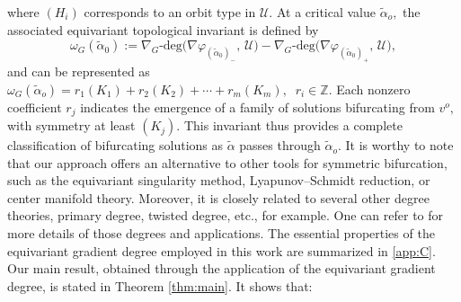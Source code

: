 \documentclass{amsart}%
\begin{document}
where $(H_i)$ corresponds to an orbit type in $\mathcal U.$ At a critical value $\tilde{\alpha}_o,$ the associated equivariant topological invariant  is defined by
\[
\omega_G(\tilde\alpha_0)
:= \nabla_G\text{-deg}\!\big(\nabla \varphi_{(\tilde\alpha_0)_-},\, \mathcal U\big)
 - \nabla_G\text{-deg}\!\big(\nabla \varphi_{(\tilde\alpha_0)_+},\, \mathcal U\big),
\]
and can be represented as
$\omega_G(\tilde{\alpha}_o)=r_1(K_1)+r_2(K_2)+\cdots +r_m(K_m),\;\; r_i\in \mathbb Z.$ 
Each nonzero coefficient $r_j$ indicates the emergence of a family of solutions bifurcating from $v^o,$ with symmetry at least $(K_j).$ This invariant thus provides a complete classification of bifurcating solutions as $\tilde{\alpha}$ passes through $\tilde{\alpha}_o.$ It is worthy to note that our approach offers an alternative to other tools for symmetric bifurcation, such as the equivariant singularity method, Lyapunov–Schmidt reduction, or center manifold theory.
Moreover, it is closely related to several other degree theories, primary degree, twisted degree, etc., for example. One can refer to \cite{balanov2025degree, balanov2006applied, hooton2017noninvasive, liu2023existence, eze2022subharmonic, balanov2010periodic, ize2003equivariant,ruan2008applications, dabkowski2017twisted,garcia2011global} for more details of those degrees and  applications. The essential properties of the equivariant gradient degree employed in this work are summarized in \ref{app:C}.\vskip0.3cm 
Our main result, obtained through the application of the equivariant gradient degree, is stated in Theorem \eqref{thm:main}. 
It shows that: 
\vskip0.3cm
\end{document}

